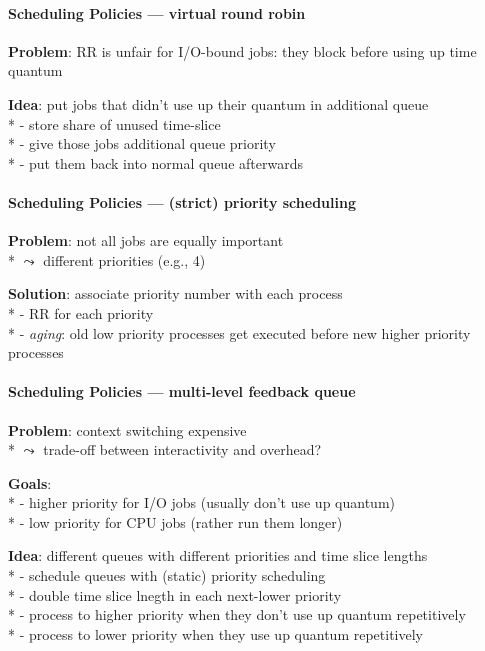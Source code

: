 \paragraph{Scheduling Policies --- virtual round robin}
\begin{items}
  \item \textbf{Problem}: RR is unfair for I/O-bound jobs: they block before using up time quantum
  \item \textbf{Idea}: put jobs that didn't use up their quantum in additional queue \\*
    - store share of unused time-slice \\*
    - give those jobs additional queue priority \\*
    - put them back into normal queue afterwards
\end{items}

\paragraph{Scheduling Policies --- (strict) priority scheduling}
\begin{items}
  \item \textbf{Problem}: not all jobs are equally important \\*
    \( \leadsto \) different priorities (e.g., 4)
  \item \textbf{Solution}: associate priority number with each process \\*
    - RR for each priority \\*
    - \emph{aging}: old low priority processes get executed before new higher priority processes
\end{items}

\paragraph{Scheduling Policies --- multi-level feedback queue}
\begin{items}
  \item \textbf{Problem}: context switching expensive \\*
    \( \leadsto \) trade-off between interactivity and overhead?
  \item \textbf{Goals}: \\*
    - higher priority for I/O jobs (usually don't use up quantum) \\*
    - low priority for CPU jobs (rather run them longer)
  \item \textbf{Idea}: different queues with different priorities and time slice lengths \\*
    - schedule queues with (static) priority scheduling \\*
    - double time slice lnegth in each next-lower priority \\*
    - process to higher priority when they don't use up quantum repetitively \\*
    - process to lower priority when they use up quantum repetitively
\end{items}

